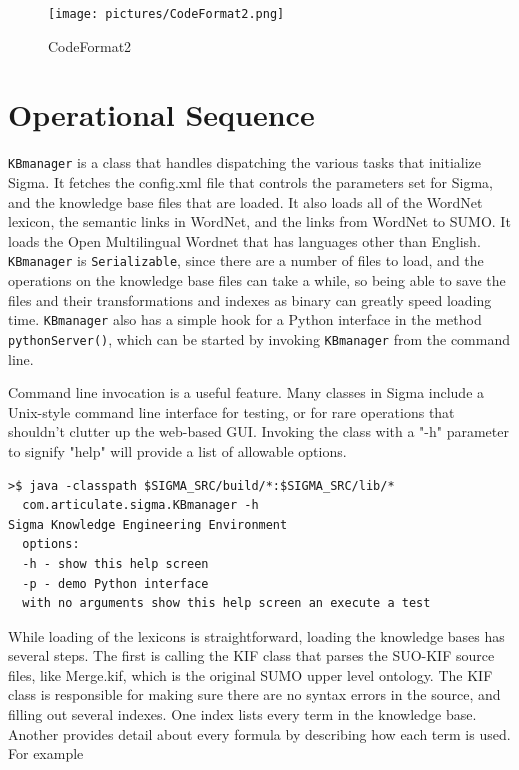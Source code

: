 \documentclass{book}
\begin{document}
\begin{figure}
  \centering
  \texttt{[image: pictures/CodeFormat2.png]}
  \caption{CodeFormat2}
  \label{fig:CodeFormat2}
\end{figure}

\section{Operational Sequence}

\texttt{KBmanager} is a class that handles dispatching
the various tasks that initialize Sigma.  It fetches the config.xml file that
controls the parameters set for Sigma, and the knowledge base files that are
loaded. It also loads all of the WordNet lexicon, the semantic links in WordNet,
and the links from WordNet to SUMO.  It loads the Open Multilingual Wordnet that
has languages other than English.  \texttt{KBmanager} is \texttt{Serializable},
since there are a number of files to load, and the operations on the knowledge
base files can take a while, so being able to save the files and their
transformations and indexes as binary can greatly speed loading time.
\texttt{KBmanager} also has a simple hook for a Python interface in the method
\texttt{pythonServer()}, which can be started by invoking \texttt{KBmanager}
from the command line.

Command line invocation is a useful feature.  Many classes in Sigma include a
Unix-style command line interface for testing, or for rare operations that
shouldn't clutter up the web-based GUI.  Invoking the class with a "-h"
parameter to signify "help" will provide a list of allowable options.

\begin{lstlisting}[basicstyle=\ttfamily\small\bfseries]
>$ java -classpath $SIGMA_SRC/build/*:$SIGMA_SRC/lib/*
  com.articulate.sigma.KBmanager -h
Sigma Knowledge Engineering Environment
  options:
  -h - show this help screen
  -p - demo Python interface
  with no arguments show this help screen an execute a test
\end{lstlisting}

While loading of the lexicons is straightforward, loading the knowledge bases
has several steps.  The first is calling the KIF class that parses the SUO-KIF
source files, like Merge.kif, which is the original SUMO upper level ontology.
The KIF class is responsible for making sure there are no syntax errors in the
source, and filling out several indexes.  One index lists every term in the
knowledge base.  Another provides detail about every formula by describing
how each term is used.  For example
\end{document}
